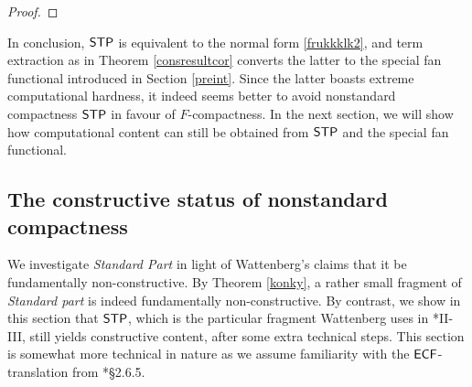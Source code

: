 \documentclass[reqno]{amsart}
\newcommand\be{\begin{equation}}
\newcommand\ee{\end{equation}}
\def\STP{\textup{\textsf{STP}}}
\def\di{\rightarrow}
\def\ECF{\textup{\textsf{ECF}}}
\def\SCF{\textup{\textsf{SCF}}}
\numberwithin{equation}{section}
\numberwithin{thm}{section}
\begin{document}
\begin{proof}
\end{proof}
In conclusion, $\STP$ is equivalent to the normal form \eqref{frukkklk2}, and term extraction as in Theorem \ref{consresultcor} converts the latter to the special fan functional introduced in Section \ref{preint}.  Since the latter boasts extreme computational hardness, it indeed seems better to avoid nonstandard compactness $\STP$ in favour of $F$-compactness.  
In the next section, we will show how computational content can still be obtained from $\STP$ and the special fan functional.  

\subsection{The constructive status of nonstandard compactness}\label{SSTP}
We investigate \emph{Standard Part} in light of Wattenberg's claims that it be fundamentally non-constructive.  
By Theorem \ref{konky}, a rather small fragment of \emph{Standard part} is indeed fundamentally non-constructive.  %
By contrast, we show in this section that $\STP$, which is the particular fragment Wattenberg uses in \cite{watje}*{II-III}, still yields constructive content, after some extra technical steps.   This section is somewhat more technical in nature as we assume familiarity with the $\ECF$-translation from  \cite{troelstra1}*{\S2.6.5}.  

\medskip
\end{document}

